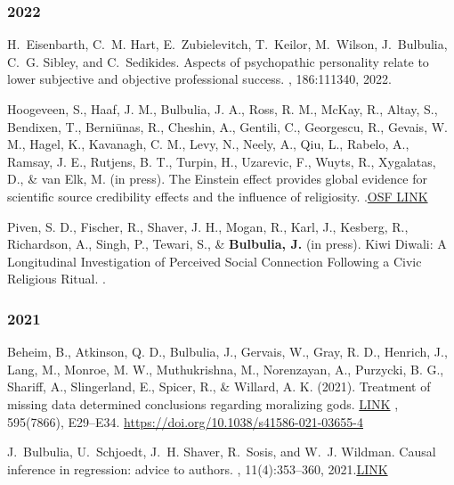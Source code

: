 \documentclass{article}
\begin{document}
\begin{thebibliography}{99}

\subsubsection*{2022}


H.~Eisenbarth, C.~M. Hart, E.~Zubielevitch, T.~Keilor, M.~Wilson, J.~Bulbulia,
  C.~G. Sibley, and C.~Sedikides.
\newblock Aspects of psychopathic personality relate to lower subjective and
  objective professional success.
, 186:111340, 2022.


Hoogeveen, S., Haaf, J. M., Bulbulia, J. A., Ross, R. M., McKay, R., Altay, S., Bendixen, T., Berniūnas, R., Cheshin, A., Gentili, C., Georgescu, R., Gevais, W. M., Hagel, K., Kavanagh, C. M., Levy, N., Neely, A., Qiu, L., Rabelo, A., Ramsay, J. E., Rutjens, B. T., Turpin, H., Uzarevic, F., Wuyts, R., Xygalatas, D., \& van Elk, M. (in press). 
\newblock The Einstein effect provides global evidence for scientific source credibility effects and the influence of religiosity. 
.\href{doi: 10.31234/osf.io/sf8ez}{OSF LINK}


 Piven, S. D., Fischer, R., Shaver, J. H., Mogan, R., Karl, J., Kesberg, R., Richardson, A., Singh, P., Tewari, S., \& {\bf Bulbulia, J.} (in press).
\newblock Kiwi Diwali: A Longitudinal Investigation of Perceived Social Connection Following a Civic Religious Ritual.
.



\subsubsection*{2021}

Beheim, B., Atkinson, Q. D., Bulbulia, J., Gervais, W., Gray, R. D., Henrich, J., Lang, M., Monroe, M. W., Muthukrishna, M., Norenzayan, A., Purzycki, B. G., Shariff, A., Slingerland, E., Spicer, R., \& Willard, A. K. (2021). 
\newblock Treatment of missing data determined conclusions regarding moralizing gods. 
\newblock \href{https://www.dropbox.com/s/98zks9waw09kmgt/s41586-021-03655-4.pdf?dl=0}{LINK}
, 595(7866), E29–E34. \href{https://doi.org/10.1038/s41586-021-03655-4}{https://doi.org/10.1038/s41586-021-03655-4}


J.~Bulbulia, U.~Schjoedt, J.~H. Shaver, R.~Sosis, and W.~J. Wildman.
\newblock Causal inference in regression: advice to authors.
, 11(4):353--360, 2021.\href{https://www.tandfonline.com/doi/full/10.1080/2153599X.2021.2001259}{LINK}



\end{thebibliography}
\end{document}
